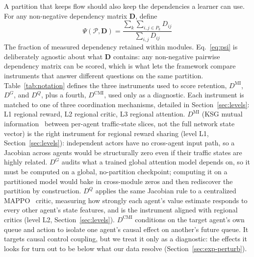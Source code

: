 \documentclass[journal]{IEEEtran}
\theoremstyle{definition}
\begin{document}
A partition that keeps flow should also keep the dependencies a learner can use.
For any non-negative dependency matrix $\mathbf{D}$, define
\begin{equation}
    \Psi(\mathcal{P},\mathbf{D})
    =
    \frac{\sum_k\sum_{i,j\in P_k} D_{ij}}
    {\sum_{i,j}D_{ij}}
    \label{eq:psi}
\end{equation}
The fraction of measured dependency retained within modules. Eq.~\eqref{eq:psi} is deliberately agnostic about what $\mathbf{D}$ contains: any non-negative pairwise dependency matrix can be scored, which is what lets the framework compare instruments that answer different questions on the same partition. Table~\ref{tab:notation} defines the three instruments used to score retention, $D^{\mathrm{MI}}$, $D^{G}$, and $D^{Q}$, plus a fourth, $D^{\mathrm{CMI}}$, used only as a diagnostic. Each instrument is matched to one of three coordination mechanisms, detailed in Section~\ref{sec:levels}: L1 regional reward, L2 regional critic, L3 regional attention. $D^{\mathrm{MI}}$ (KSG mutual information~\citep{kraskov2004ksg} between per-agent traffic-state slices, not the full network state vector) is the right instrument for regional reward sharing (level L1, Section~\ref{sec:levels}): independent actors have no cross-agent input path, so a Jacobian across agents would be structurally zero even if their traffic states are highly related. $D^{G}$ audits what a trained global attention model depends on, so it must be computed on a global, no-partition checkpoint; computing it on a partitioned model would bake in cross-module zeros and then rediscover the partition by construction. $D^{Q}$ applies the same Jacobian rule to a centralized MAPPO~\citep{yu2022mappo} critic, measuring how strongly each agent's value estimate responds to every other agent's state features, and is the instrument aligned with regional critics (level L2, Section~\ref{sec:levels}). $D^{\mathrm{CMI}}$ conditions on the target agent's own queue and action to isolate one agent's causal effect on another's future queue. It targets causal control coupling, but we treat it only as a diagnostic: the effects it looks for turn out to be below what our data resolve (Section~\ref{sec:exp-perturb}).
\end{document}
